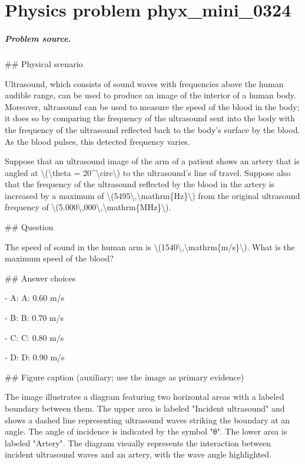 
\chapter{Physics problem phyx\_mini\_0324}
\label{ch:PhyXMiniProblems_problem_phyx_mini_0324}

\paragraph{Problem source.}
\#\# Physical scenario

Ultrasound, which consists of sound waves with frequencies above the human audible range, can be used to produce an image of the interior of a human body. Moreover, ultrasound can be used to measure the speed of the blood in the body; it does so by comparing the frequency of the ultrasound sent into the body with the frequency of the ultrasound reflected back to the body's surface by the blood. As the blood pulses, this detected frequency varies.

Suppose that an ultrasound image of the arm of a patient shows an artery that is angled at \textbackslash{}(\textbackslash{}theta = 20\textasciicircum{}\textbackslash{}circ\textbackslash{}) to the ultrasound's line of travel. Suppose also that the frequency of the ultrasound reflected by the blood in the artery is increased by a maximum of \textbackslash{}(5495\textbackslash{},\textbackslash{}mathrm\{Hz\}\textbackslash{}) from the original ultrasound frequency of \textbackslash{}(5.000\textbackslash{},000\textbackslash{},\textbackslash{}mathrm\{MHz\}\textbackslash{}).

\#\# Question

The speed of sound in the human arm is \textbackslash{}(1540\textbackslash{},\textbackslash{}mathrm\{m/s\}\textbackslash{}). What is the maximum speed of the blood?

\#\# Answer choices

- A: A: 0.60 m/s

- B: B: 0.70 m/s

- C: C: 0.80 m/s

- D: D: 0.90 m/s

\#\# Figure caption (auxiliary; use the image as primary evidence)

The image illustrates a diagram featuring two horizontal areas with a labeled boundary between them. The upper area is labeled "Incident ultrasound" and shows a dashed line representing ultrasound waves striking the boundary at an angle. The angle of incidence is indicated by the symbol "θ". The lower area is labeled "Artery". The diagram visually represents the interaction between incident ultrasound waves and an artery, with the wave angle highlighted.

